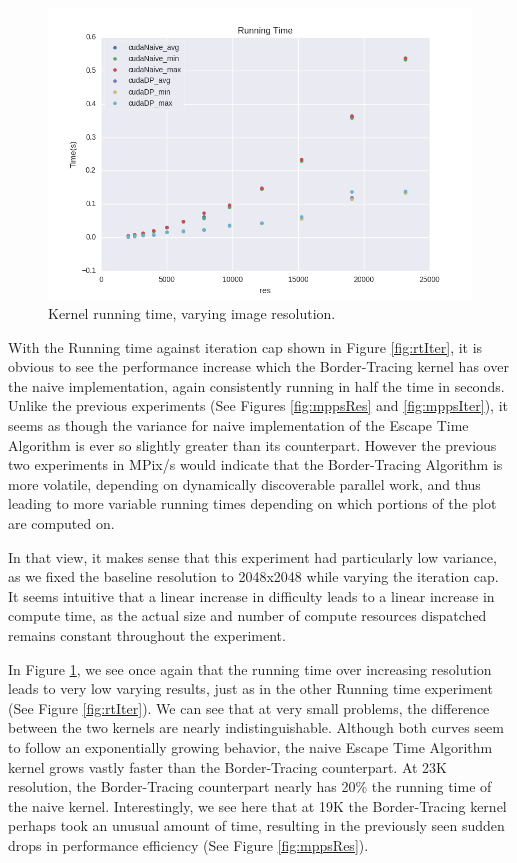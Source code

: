 \documentclass[letterpaper]{article}
\begin{document}
\begin{multicols}{2}
\begin{figure}[H]
  \includegraphics[width=\linewidth]{experiments3/running_time_graph_exp_res.png}
  \caption{Kernel running time, varying image resolution.}
  \label{fig:rtRes}
\end{figure}

With the Running time against iteration cap shown in Figure \ref{fig:rtIter}, it
  is obvious to see the performance increase which the Border-Tracing kernel has
  over the naive implementation, again consistently running in half the time in
  seconds. Unlike the previous experiments (See Figures \ref{fig:mppsRes} and
  \ref{fig:mppsIter}), it seems as though the variance for naive implementation
  of the Escape Time Algorithm is ever so slightly greater than its counterpart.
However the previous two experiments in MPix/s would indicate that the
  Border-Tracing Algorithm is more volatile, depending on dynamically
  discoverable parallel work, and thus leading to more variable running times
  depending on which portions of the plot are computed on. 

In that view, it makes sense that this experiment had particularly low variance,
  as we fixed the baseline resolution to 2048x2048 while varying the iteration
  cap. It seems intuitive that a linear increase in difficulty leads to a linear
  increase in compute time, as the actual size and number of compute resources
  dispatched remains constant throughout the experiment. 

In Figure \ref{fig:rtRes}, we see once again that the running time over
  increasing resolution leads to very low varying results, just as in the other
  Running time experiment (See Figure \ref{fig:rtIter}). We can see that at very
  small problems, the difference between the two kernels are nearly
  indistinguishable. Although both curves seem to follow an exponentially
  growing behavior, the naive Escape Time Algorithm kernel grows vastly faster
  than the Border-Tracing counterpart. At 23K resolution, the Border-Tracing
  counterpart nearly has 20\% the running time of the naive kernel.
  Interestingly, we see here that at 19K the Border-Tracing kernel perhaps took
  an unusual amount of time, resulting in the previously seen sudden drops in
  performance efficiency (See Figure \ref{fig:mppsRes}).  


\end{multicols}
\end{document}
